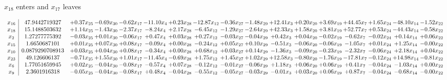 \documentclass[9pt]{article}
\begin{document}
 $ x_{18} $ enters and $ x_{17} $ leaves 

 \[\begin{array}{c| c c@{\hskip 2pt} c@{\hskip 2pt} c@{\hskip 2pt} c@{\hskip 2pt} c@{\hskip 2pt} c@{\hskip 2pt} c@{\hskip 2pt} c@{\hskip 2pt} c@{\hskip 2pt} c@{\hskip 2pt} c@{\hskip 2pt} c@{\hskip 2pt} c@{\hskip 2pt} c@{\hskip 2pt} c@{\hskip 2pt} }
 x_{16}   &  47.9442719327 & +  0.37 x_{25} & -0.69 x_{30} & -0.62 x_{17} & -11.10 x_{4} & +  0.23 x_{28} & -12.87 x_{12} & -0.36 x_{27} & -1.48 x_{29} & + 12.41 x_{3} & +  0.20 x_{20} & +  3.69 x_{19} & + 44.45 x_{7} & +  1.65 x_{24} & -48.10 x_{14} & -1.52 x_{22}\\
 x_{18}   &  15.1488503632 & +  1.14 x_{25} & -1.43 x_{30} & -2.37 x_{17} & -8.24 x_{4} & +  2.17 x_{28} & -6.45 x_{12} & -1.29 x_{27} & -2.64 x_{29} & + 42.33 x_{3} & +  1.58 x_{20} & +  3.81 x_{19} & + 52.77 x_{7} & +  0.53 x_{24} & -44.43 x_{14} & -0.58 x_{22}\\
 x_{2}   &  1.27277775392 & -0.03 x_{25} & +  0.01 x_{30} & -0.06 x_{17} & +  0.47 x_{4} & +  0.03 x_{28} & +  0.27 x_{12} & -0.03 x_{27} & -0.04 x_{29} & +  0.42 x_{3} & +  0.04 x_{20} & -0.02 x_{19} & -0.62 x_{7} & -0.02 x_{24} & +  0.14 x_{14} & +  0.06 x_{22}\\
 x_{15}   &  1.6650687101 & +  0.01 x_{25} & +  0.07 x_{30} & +  0.08 x_{17} & -0.09 x_{4} & +  0.00 x_{28} & -0.24 x_{12} & +  0.05 x_{27} & +  0.10 x_{29} & -0.51 x_{3} & -0.06 x_{20} & -0.06 x_{19} & -1.05 x_{7} & +  0.01 x_{24} & +  1.25 x_{14} & -0.00 x_{22}\\
 x_{10}   &  0.0879290708913 & +  0.03 x_{25} & +  0.04 x_{30} & +  0.08 x_{17} & -0.34 x_{4} & +  0.00 x_{28} & +  0.68 x_{12} & +  0.03 x_{27} & +  0.14 x_{29} & -1.36 x_{3} & -0.09 x_{20} & -0.23 x_{19} & -2.32 x_{7} & -0.06 x_{24} & +  2.18 x_{14} & +  0.04 x_{22}\\
 x_{23}   &  49.126606137 & -0.71 x_{25} & +  1.55 x_{30} & +  1.01 x_{17} & -11.45 x_{4} & -0.69 x_{28} & +  1.75 x_{12} & +  1.45 x_{27} & +  1.02 x_{29} & + 12.58 x_{3} & -0.80 x_{20} & -1.76 x_{19} & -17.81 x_{7} & -0.12 x_{24} & + 14.98 x_{14} & -0.81 x_{22}\\
 x_{6}   &  1.77051659945 & +  0.02 x_{25} & -0.04 x_{30} & -0.08 x_{17} & -0.57 x_{4} & +  0.07 x_{28} & -0.12 x_{12} & -0.01 x_{27} & -0.06 x_{29} & +  1.18 x_{3} & +  0.06 x_{20} & +  0.06 x_{19} & +  0.41 x_{7} & -0.04 x_{24} & -1.03 x_{14} & +  0.00 x_{22}\\
 x_{9}   &  2.3601916318 & -0.05 x_{25} & -0.04 x_{30} & -0.08 x_{17} & +  0.48 x_{4} & -0.04 x_{28} & -0.55 x_{12} & -0.05 x_{27} & -0.03 x_{29} & -0.01 x_{3} & +  0.03 x_{20} & +  0.06 x_{19} & +  0.87 x_{7} & -0.04 x_{24} & -0.68 x_{14} & -0.00 x_{22}\\

\end{array}\]
\end{document}
